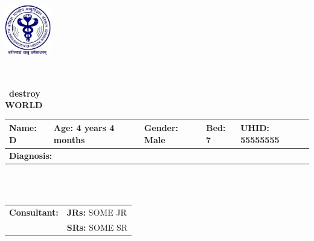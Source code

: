\documentclass{article}
\begin{document}
\
\noindent
\begin{minipage}{0.2\textwidth} %
    \includegraphics[width=2cm]{RESOURCES/AIIMS_LOGO.png} %
\end{minipage}\
\vspace{-1cm} %
\hfill
\fontsize{9pt}{11pt}\selectfont %
\begin{center}\
    \textbf{destroy} \\
    \textbf{WORLD} \\
\end{center}
\fontsize{10pt}{12pt}\selectfont %
\noindent\begin{tabular}{|p{5cm}|p{4cm}|p{2.5cm}|p{1.5cm}|p{3cm}|}
    \hline
    \textbf{Name:} D & \textbf{Age:} 4 years 4 months & \textbf{Gender:} Male & \textbf{Bed:} 7 & \textbf{UHID:} 55555555 \\
    \hline
    \multicolumn{5}{|p{19cm}|}{\textbf{Diagnosis:}  }\\
    \hline
\end{tabular}
\\
\\
\noindent\begin{tabular}{|p{11.3cm}|p{7.3cm}|}
     \hline
    \textbf{Consultant:}       & \textbf{JRs:} SOME JR \\
    \cline{2-2}
      & \textbf{SRs:} SOME SR \\
    \hline
\end{tabular}
\vspace{0.1cm} %
\noindent
\end{document}
